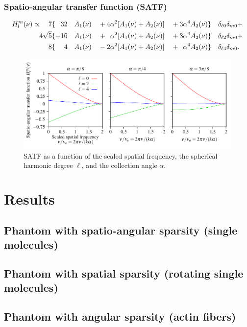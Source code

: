 \documentclass{osa-article}
\begin{document}
 \subsubsection{Spatio-angular transfer function (SATF)}
  \begin{alignat}{6}
  H_l^m(\nu) \propto \quad 7&\{\hphantom{-}32&&A_1(\nu)&& + 4\alpha^2[A_1(\nu) + A_2(\nu)]&&+ 3\alpha^4A_2(\nu)\}&&\delta_{\ell 0}\delta_{m0}+\nonumber\\
  4\sqrt{5}&\{-16&&A_1(\nu)&& + \hphantom{1}\alpha^2[A_1(\nu) + A_2(\nu)] &&+ 3\alpha^4A_2(\nu)\}&&\delta_{\ell 2}\delta_{m0} + \nonumber\\
  8&\{\hphantom{-1}4&&A_1(\nu)&& - 2\alpha^2[A_1(\nu) + A_2(\nu)] &&+ \hphantom{1}\alpha^4A_2(\nu)\}&&\delta_{\ell 4}\delta_{m0}.
\end{alignat}

\begin{figure}[h]
 \centering
   \centering
   \includegraphics[scale=0.8]{../figures/satf/satf.pdf}
   \caption{SATF as a function of the scaled spatial frequency, the spherical
     harmonic degree $\ell$, and the collection angle $\alpha$. }
   \label{fig:atf}
 \end{figure}
 
\section{Results}
\subsection{Phantom with spatio-angular sparsity (single molecules)}
\subsection{Phantom with spatial sparsity (rotating single molecules)}
\subsection{Phantom with angular sparsity (actin fibers)}
\end{document}
